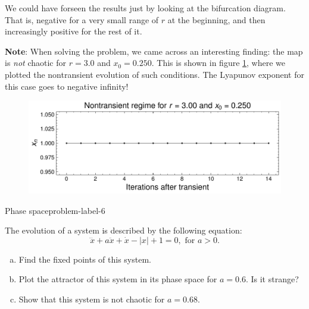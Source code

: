 \begin{enumerate}[(a)]
    We could have forseen the results just by looking at the bifurcation diagram. That is, negative
    for a very small range of $r$ at the beginning, and then increasingly positive for the rest
    of it.

    \textbf{Note}: When solving the problem, we came across an interesting finding: the map
    is \textit{not} chaotic for $r = 3.0$ and $x_0 = 0.250$. This is shown in figure \ref{fig:5c}, where
    we plotted the nontransient evolution of such conditions.     The Lyapunov exponent for this case goes to negative infinity!


    \begin{figure}[!ht]
        \centering
        \includegraphics[scale=0.65]{images/not-chaotic.pdf}
        \label{fig:5c}
    \end{figure}


\end{enumerate}
\newpage
\begin{problem}{Phase space}{problem-label-6}

    The evolution of a system is described by the following equation:
    \[
        \dddot{x} + a\ddot{x}+\dot{x}-|x|+1=0, \text{ for } a > 0.
    \]

    \begin{enumerate}[(a)]
        \item Find the fixed points of this system.
        \item Plot the attractor of this system in its phase space for $a = 0.6$.
        Is it strange?
        \item Show that this system is not chaotic for $a = 0.68$.
    \end{enumerate}

\end{problem}

